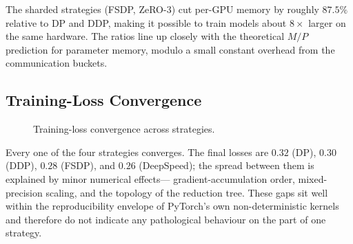 The sharded strategies (FSDP, ZeRO-3) cut per-GPU memory by roughly
$87.5\%$ relative to DP and DDP, making it possible to train models
about $8\times$ larger on the same hardware. The ratios line up
closely with the theoretical $M/P$ prediction for parameter memory,
modulo a small constant overhead from the communication buckets.

\subsection{Training-Loss Convergence}\label{sec:res_loss}
\begin{figure}[H]
\centering
{}
\caption{Training-loss convergence across strategies.}
\label{fig:loss_convergence}
\end{figure}

Every one of the four strategies converges. The final losses are
$0.32$ (DP), $0.30$ (DDP), $0.28$ (FSDP), and $0.26$ (DeepSpeed);
the spread between them is explained by minor numerical effects---
gradient-accumulation order, mixed-precision scaling, and the
topology of the reduction tree. These gaps sit well within the
reproducibility envelope of PyTorch's own non-deterministic
kernels and therefore do not indicate any pathological behaviour on
the part of one strategy.

